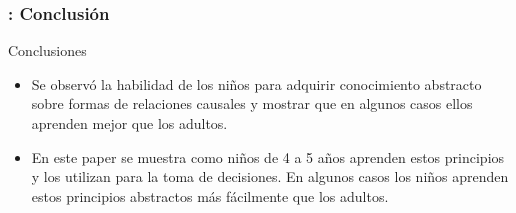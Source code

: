 \begin{frame}[fragile]
  \frametitle{\shortt: Conclusión}
    
    \begin{exampleblock}{Conclusiones}
    \begin{itemize}
       \item Se observó la habilidad de los niños para adquirir conocimiento abstracto sobre formas de relaciones causales y mostrar que en algunos casos ellos aprenden mejor que los adultos.
       \item En este paper se muestra como niños de 4 a 5 años aprenden estos principios  y los utilizan para la toma de decisiones. En algunos casos los niños aprenden estos principios abstractos más fácilmente que los adultos.

    \end{itemize}
    \end{exampleblock}
\end{frame}
